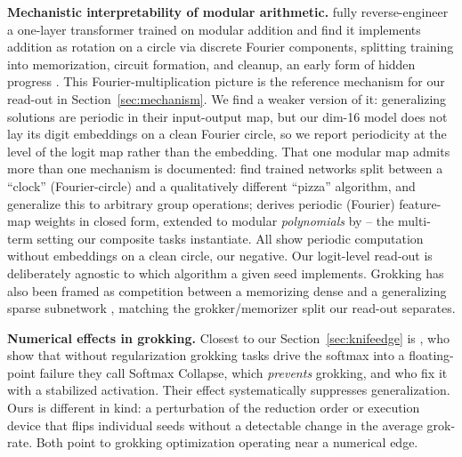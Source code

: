 \documentclass[10pt]{article} %
\begin{document}
\textbf{Mechanistic interpretability of modular arithmetic.} \citet{nanda2023progress} fully
reverse-engineer a one-layer transformer trained on modular addition and find it implements
addition as rotation on a circle via discrete Fourier components, splitting training into
memorization, circuit formation, and cleanup, an early form of hidden progress
\citep{barak2022hidden}. This Fourier-multiplication picture is the
reference mechanism for our read-out in Section~\ref{sec:mechanism}. We find a weaker version of
it: generalizing solutions are periodic in their input-output map, but our dim-16 model does not
lay its digit embeddings on a clean Fourier circle, so we report periodicity at the level of the
logit map rather than the embedding. That one modular map admits more than one mechanism is documented: \citet{zhong2023clock} find
trained networks split between a ``clock'' (Fourier-circle) and a qualitatively different ``pizza''
algorithm, and \citet{chughtai2023toy} generalize this to arbitrary group operations;
\citet{gromov2023grokking} derives periodic (Fourier) feature-map weights in closed form, extended to
modular \emph{polynomials} by \citet{doshi2024polynomials} -- the multi-term setting our composite
tasks instantiate. All show periodic computation without embeddings on a clean circle, our negative. Our logit-level read-out is deliberately agnostic to which
algorithm a given seed implements.
Grokking has also been framed as competition between a memorizing dense and a generalizing sparse
subnetwork \citep{merrill2023two}, matching the grokker/memorizer split our read-out separates.

\textbf{Numerical effects in grokking.} Closest to our Section~\ref{sec:knifeedge} is
\citet{prieto2025edge}, who show that without regularization grokking tasks drive the softmax into
a floating-point failure they call Softmax Collapse, which \emph{prevents} grokking, and who fix
it with a stabilized activation. Their effect systematically suppresses generalization. Ours is
different in kind: a perturbation of the
reduction order or execution device that flips individual seeds without a detectable change in the
average grok-rate. Both point to grokking optimization operating near a numerical edge.
\end{document}
